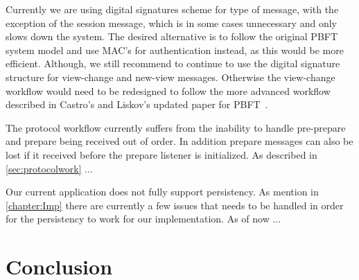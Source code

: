 Currently we are using digital signatures scheme for type of message, with the exception of the session message, which is in some cases unnecessary and only slows down the system. The desired alternative is to follow the original PBFT system model and use MAC's for authentication instead, as this would be more efficient. Although, we still recommend to continue to use the digital signature structure for view-change and new-view messages. Otherwise the view-change workflow would need to be redesigned to follow the more advanced workflow described in Castro's and Liskov's updated paper for PBFT~\cite[p.~410-414]{PAPER:PBFTRecovery}. 

The protocol workflow currently suffers from the inability to handle pre-prepare and prepare being received out of order. In addition prepare messages can also be lost if it received before the prepare listener is initialized. As described in \autoref{sec:protocolwork} ...

Our current application does not fully support persistency. As mention in \autoref{chapter:Imp} there are currently a few issues that needs to be handled in order for the persistency to work for our implementation. As of now ...

\section{Conclusion}
